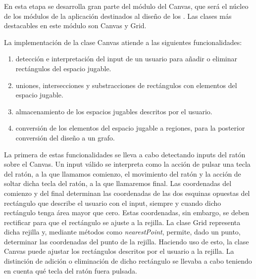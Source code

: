 En esta etapa se desarrolla gran parte del módulo del Canvas, que será el núcleo de los módulos de la aplicación destinados al diseño de los . Las clases más destacables en este módulo son Canvas y Grid.

La implementación de la clase Canvas atiende a las siguientes funcionalidades:
\begin{enumerate}
	\item detección e interpretación del input de un usuario para añadir o eliminar rectángulos del espacio jugable.
	\item uniones, intersecciones y substracciones de rectángulos con elementos del espacio jugable.
	\item almacenamiento de los espacios jugables descritos por el usuario.
	\item conversión de los elementos del espacio jugable a regiones, para la posterior conversión del diseño a un grafo.
\end{enumerate}

La primera de estas funcionalidades se lleva a cabo detectando inputs del ratón sobre el Canvas. Un input válido se interpreta como la acción de pulsar una tecla del ratón, a la que llamamos comienzo, el movimiento del ratón y la acción de soltar dicha tecla del ratón, a la que llamaremos final.
Las coordenadas del comienzo y del final determinan las coordenadas de las dos esquinas opuestas del rectángulo que describe el usuario con el input, siempre y cuando dicho rectángulo tenga área mayor que cero. Estas coordenadas, sin embargo, se deben rectificar para que el rectángulo se ajuste a la rejilla.
La clase Grid representa dicha rejilla y, mediante métodos como \textit{nearestPoint}, permite, dado un punto, determinar las coordenadas del punto de la rejilla. Haciendo uso de esto, la clase Canvas puede ajustar los rectángulos descritos por el usuario a la rejilla.
La distinción de adición o eliminación de dicho rectángulo se llevaba a cabo teniendo en cuenta qué tecla del ratón fuera pulsada.

